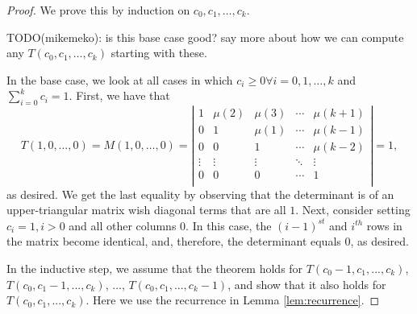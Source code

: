 \documentclass[12pt]{amsart}
\newcommand{\ifact}{\mu}
\newcommand{\M}{M}
\begin{document}
\begin{proof}
We prove this by induction on $c_0, c_1, \dots, c_k$.

TODO(mikemeko): is this base case good? say more about how we can compute any $T(c_0, c_1, \dots, c_k)$ starting with these.

In the base case, we look at all cases in which $c_i \geq 0 \forall i = 0,1,\dots,k$ and $\sum_{i=0}^{k}{c_i} = 1$. First, we have that
$$
T(1,0,\dots,0) = \M(1,0,\dots,0)=\left|
\begin{matrix}
1 & \ifact(2) & \ifact(3) & \cdots & \ifact(k+1) \\
0 & 1 & \ifact(1) & \cdots & \ifact(k-1) \\
0 & 0 & 1 & \cdots & \ifact(k-2) \\
\vdots & \vdots & \vdots & \ddots & \vdots \\
0 & 0 & 0 & \cdots & 1 \\
\end{matrix} \right| = 1,
$$
as desired. We get the last equality by observing that the determinant is of an upper-triangular matrix wish diagonal terms that are all $1$. Next, consider setting $c_i = 1, i > 0$ and all other columns $0$. In this case, the $(i-1)^{st}$ and $i^{th}$ rows in the matrix become identical, and, therefore, the determinant equals $0$, as desired.

In the inductive step, we assume that the theorem holds for $T(c_0-1,c_1,...,c_k)$, $T(c_0,c_1-1,...,c_k)$, $\dots$, $T(c_0,c_1,...,c_k-1)$, and show that it also holds for $T(c_0,c_1,...,c_k)$. Here we use the recurrence in Lemma \ref{lem:recurrence}.


\end{proof}
\end{document}

